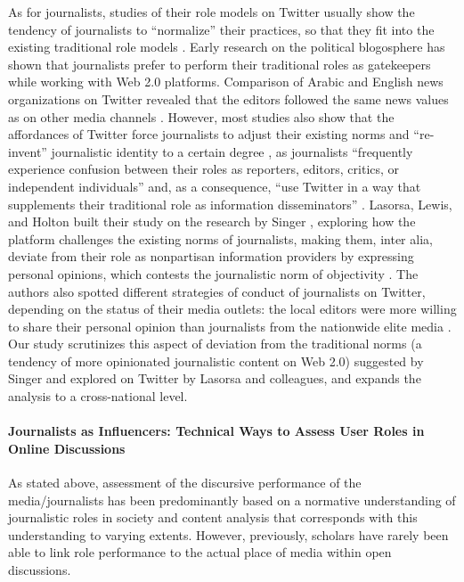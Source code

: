 As for journalists, studies of their role models on Twitter usually show the tendency of journalists to “normalize” their practices, so that they fit into the existing traditional role models \cite{LasorsaLewisHolton,TandocVos}. Early research on the political blogosphere \cite{Singer2005} has shown that journalists prefer to perform their traditional roles as gatekeepers while working with Web 2.0 platforms. Comparison of Arabic and English news organizations on Twitter revealed that the editors followed the same news values as on other media channels \cite{AlRawi}. However, most studies also show that the affordances of Twitter force journalists to adjust their existing norms and “re-invent” journalistic identity to a certain degree \cite{Olausson}, as journalists “frequently experience confusion between their roles as reporters, editors, critics, or independent individuals” and, as a consequence, “use Twitter in a way that supplements their traditional role as information disseminators” \cite[p.~267]{PapacharissiDeFatimaOliveira}. Lasorsa, Lewis, and Holton \cite{LasorsaLewisHolton} built their study on the research by Singer \cite{Singer2005}, exploring how the platform challenges the existing norms of journalists, making them, inter alia, deviate from their role as nonpartisan information providers by expressing personal opinions, which contests the journalistic norm of objectivity \cite{LasorsaLewisHolton}. The authors also spotted different strategies of conduct of journalists on Twitter, depending on the status of their media outlets: the local editors were more willing to share their personal opinion than journalists from the nationwide elite media \cite{LasorsaLewisHolton}. Our study scrutinizes this aspect of deviation from the traditional norms (a tendency of more opinionated journalistic content on Web 2.0) suggested by Singer and explored on Twitter by Lasorsa and colleagues, and expands the analysis to a cross-national level.

\paragraph{Journalists as Influencers: Technical Ways to Assess User Roles in Online Discussions}
As stated above, assessment of the discursive performance of the media/journalists has been predominantly based on a normative understanding of journalistic roles in society and content analysis that corresponds with this understanding to varying extents. However, previously, scholars have rarely been able to link role performance to the actual place of media within open discussions.

